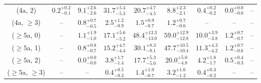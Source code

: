 \begin{table}[h!]
{\begin{tabular}{ccccccccc}
	(4a, 2) & $0.2^{+ 0.2 }_{- 0.1 }$ & $9.1^{+ 2.6 }_{- 2.6 }$ & $31.7^{+ 5.4 }_{- 5.3 }$ & $20.7^{+ 4.7 }_{- 4.5 }$ & $8.8^{+ 2.3 }_{- 2.1 }$ & $0.4^{+ 0.2 }_{- 0.2 }$ & $0.0^{+ 0.0 }_{- 0.0 }$ & -- \\[0.5ex] 
	(4a, $\ge3$) & -- & $0.8^{+ 0.7 }_{- 0.5 }$ & $2.5^{+ 1.2 }_{- 0.9 }$ & $1.5^{+ 0.9 }_{- 0.7 }$ & $1.2^{+ 0.7 }_{- 0.6 }$ & -- & -- & -- \\[0.5ex] 
	($\ge5$a, 0) & -- & $1.1^{+ 1.9 }_{- 1.0 }$ & $17.1^{+ 5.6 }_{- 5.2 }$ & $48.4^{+ 13.3 }_{- 13.0 }$ & $59.0^{+ 12.9 }_{- 12.8 }$ & $10.0^{+ 3.9 }_{- 3.8 }$ & $1.2^{+ 0.7 }_{- 0.7 }$ & -- \\[0.5ex] 
	($\ge5$a, 1) & -- & $0.8^{+ 0.8 }_{- 0.7 }$ & $15.2^{+ 4.7 }_{- 4.4 }$ & $30.1^{+ 8.3 }_{- 8.1 }$ & $47.7^{+ 10.5 }_{- 10.4 }$ & $11.3^{+ 4.3 }_{- 4.2 }$ & $1.2^{+ 0.7 }_{- 0.6 }$ & -- \\[0.5ex] 
	($\ge5$a, 2) & -- & $0.0^{+ 0.0 }_{- 0.0 }$ & $3.8^{+ 1.7 }_{- 1.4 }$ & $17.7^{+ 5.3 }_{- 5.0 }$ & $20.0^{+ 5.0 }_{- 4.8 }$ & $4.2^{+ 1.8 }_{- 1.7 }$ & $0.5^{+ 0.4 }_{- 0.3 }$ & -- \\[0.5ex] 
	($\ge5$a, $\ge3$) & -- & -- & $0.4^{+ 0.5 }_{- 0.3 }$ & $1.4^{+ 1.0 }_{- 0.7 }$ & $3.2^{+ 1.6 }_{- 1.2 }$ & $0.4^{+ 0.3 }_{- 0.2 }$ & -- & -- \\[0.5ex] 
	\hline
	\hline
\end{tabular}}
\end{table}
